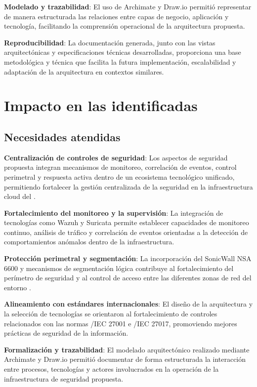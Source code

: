 \textbf{Modelado y trazabilidad}: El uso de Archimate y Draw.io permitió representar de manera estructurada las relaciones entre capas de 
negocio, aplicación y tecnología, facilitando la comprensión operacional de la arquitectura propuesta.

\textbf{Reproducibilidad}: La documentación generada, junto con las vistas arquitectónicas y especificaciones técnicas desarrolladas, 
proporciona una base metodológica y técnica que facilita la futura implementación, escalabilidad y adaptación de la arquitectura en 
contextos similares.

\section{Impacto en las \NPO identificadas}
\noindent

\subsection{Necesidades atendidas}
\noindent

\textbf{Centralización de controles de seguridad}: Los aspectos de seguridad propuesta integran mecanismos de monitoreo, correlación de 
eventos, control perimetral y respuesta activa dentro de un ecosistema tecnológico unificado, permitiendo fortalecer la gestión 
centralizada de la seguridad en la infraestructura cloud del \GRID.

\textbf{Fortalecimiento del monitoreo y la supervisión}: La integración de tecnologías como Wazuh y Suricata permite establecer capacidades 
de monitoreo continuo, análisis de tráfico y correlación de eventos orientadas a la detección de comportamientos anómalos dentro de la 
infraestructura.

\textbf{Protección perimetral y segmentación}: La incorporación del SonicWall NSA 6600 y mecanismos de segmentación lógica contribuye al 
fortalecimiento del perímetro de seguridad y al control de acceso entre las diferentes zonas de red del entorno \GRID.

\textbf{Alineamiento con estándares internacionales}: El diseño de la arquitectura y la selección de tecnologías se orientaron al 
fortalecimiento de controles relacionados con las normas \ISO/IEC 27001 e \ISO/IEC 27017, promoviendo mejores prácticas de seguridad de la 
información.

\textbf{Formalización y trazabilidad}: El modelado arquitectónico realizado mediante Archimate y Draw.io permitió documentar de forma 
estructurada la interacción entre procesos, tecnologías y actores involucrados en la operación de la infraestructura de seguridad propuesta.


